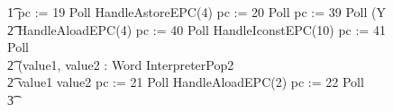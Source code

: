 \begin{figure}[t!]
\begin{circus}
    \t1 pc := 19 \circseq Poll \circseq HandleAstoreEPC(4) \circseq pc := 20 \circseq Poll \circseq pc := 39 \circseq  Poll \circseq (\circmu Y \circspot \\
    \t2 HandleAloadEPC(4) \circseq pc := 40 \circseq Poll \circseq HandleIconstEPC(10) \circseq  pc := 41 \circseq Poll \circseq \\
    \t2 (\circvar value1, value2 : Word \circspot InterpreterPop2 \circseq \\
    \t2 \circif value1 \leq value2 \circthen pc := 21 \circseq Poll \circseq HandleAloadEPC(2) \circseq pc := 22 \circseq Poll \circseq \\
    \t3 {} \cdots {} \\

\end{circus}
\end{figure}
